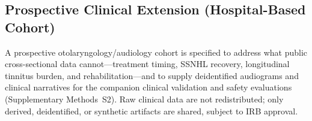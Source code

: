 \subsection{Prospective Clinical Extension (Hospital-Based Cohort)}
A prospective otolaryngology/audiology cohort is specified to address what public cross-sectional data cannot---treatment timing, SSNHL recovery, longitudinal tinnitus burden, and rehabilitation---and to supply deidentified audiograms and clinical narratives for the companion clinical validation and safety evaluations (Supplementary Methods~S2). Raw clinical data are not redistributed; only derived, deidentified, or synthetic artifacts are shared, subject to IRB approval.
